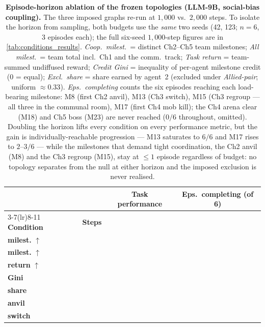 \begin{table}[t]
\centering
\caption{\textbf{Episode-horizon ablation of the frozen topologies (LLM-9B,
social-bias coupling).} The three imposed graphs re-run at $1{,}000$ vs.\
$2{,}000$ steps. To isolate the horizon from sampling, both budgets use the
\emph{same} two seeds (42, 123; $n{=}6$, 3 episodes each); the full six-seed
$1{,}000$-step figures are in \autoref{tab:conditions_results}.
\emph{Coop.\ milest.}\ = distinct Ch2--Ch5 team milestones; \emph{All
milest.}\ = team total incl.\ Ch1 and the comm.\ track; \emph{Task return} =
team-summed undiffused reward; \emph{Credit Gini} = inequality of per-agent
milestone credit ($0$ = equal); \emph{Excl.\ share} = share earned by
agent~2 (excluded under \emph{Allied-pair}; uniform $\approx 0.33$).
\emph{Eps.\ completing} counts the six episodes reaching each load-bearing
milestone: M8 (first Ch2 anvil), M13 (Ch3 switch), M15 (Ch3 regroup --- all
three in the communal room), M17 (first Ch4 mob kill); the Ch4 arena clear
(M18) and Ch5 boss (M23) are never reached ($0/6$ throughout, omitted).
Doubling the horizon lifts every condition on every performance metric, but
the gain is individually-reachable progression --- M13 saturates to $6/6$
and M17 rises to $2$--$3/6$ --- while the milestones that demand tight
coordination, the Ch2 anvil (M8) and the Ch3 regroup (M15), stay at
${\leq}1$ episode regardless of budget: no topology separates from the null
at either horizon and the imposed exclusion is never realised.}
\label{tab:topology_horizon}
\small
\setlength{\tabcolsep}{4pt}
\renewcommand{\arraystretch}{1.2}
\begin{tabular}{l l ccc cc cccc}
\toprule
& & \multicolumn{5}{c}{\textbf{Task performance}}
& \multicolumn{4}{c}{\textbf{Eps.\ completing (of 6)}} \\
\cmidrule(lr){3-7}\cmidrule(lr){8-11}
\textbf{Condition} & \textbf{Steps}
& \makecell{\textbf{Coop.}\\\textbf{milest.} $\uparrow$}
& \makecell{\textbf{All}\\\textbf{milest.} $\uparrow$}
& \makecell{\textbf{Task}\\\textbf{return} $\uparrow$}
& \makecell{\textbf{Credit}\\\textbf{Gini}}
& \makecell{\textbf{Excl.}\\\textbf{share}}
& \makecell{\textbf{M8}\\\textbf{anvil}}
& \makecell{\textbf{M13}\\\textbf{switch}}

\end{tabular}
\end{table}
